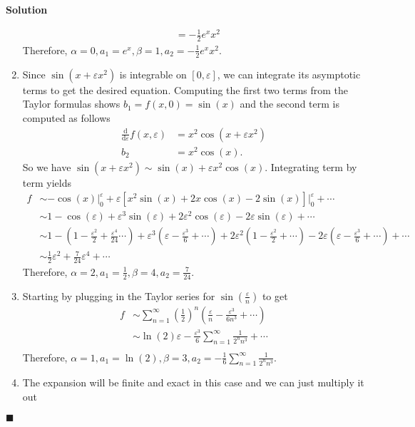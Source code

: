\documentclass[11pt]{article}
\newcommand{\vep}{\varepsilon}
\theoremstyle{problemstyle}
\newenvironment{solution}
  {\noindent\textbf{Solution}\quad}
  {\hfill$\blacksquare$\par\vspace{1em}}
\begin{document}
\begin{solution}
\begin{enumerate}
\begin{align*}
            & = -\frac{1}{2} e^x x^2
      \end{align*}
      Therefore, $\alpha = 0, a_1 = e^x, \beta = 1, a_2 = -\frac{1}{2} e^x x^2$.
    \item Since $\sin(x + \vep x^2)$ is integrable on $[0,\vep]$, we can integrate its asymptotic
      terms to get the desired equation. Computing the first two terms from the Taylor formulas
      shows $b_1 = f(x, 0) = \sin(x)$ and the second term is computed as follows
      \begin{align*}
        \frac{\mathrm{d}}{\mathrm{d}\vep}f(x,\vep) & = x^2 \cos(x + \vep x^2) \\
        b_2 & = x^2 \cos(x).
      \end{align*}
      So we have $\sin(x + \vep x^2) \sim \sin(x) + \vep x^2 \cos(x)$. Integrating term by term
      yields 
      \begin{align*}
        f & \sim -\cos(x) \rvert_0^\vep + \vep \left[ x^2 \sin(x) + 2x \cos(x) - 2 \sin(x) \right]
            \rvert_0^\vep + \cdots \\
          & \sim 1 - \cos(\vep) + \vep^3 \sin(\vep) + 2\vep^2 \cos(\vep) - 2\vep\sin(\vep) + \cdots \\
          & \sim 1 - (1 - \frac{\vep^2}{2} + \frac{\vep^4}{24} \cdots) + \vep^3 \left( \vep -
            \frac{\vep^3}{6} + \cdots \right) + 2\vep^2 \left( 1 - \frac{\vep^2}{2} + \cdots \right) -
            2 \vep \left( \vep - \frac{\vep^3}{6} + \cdots \right) + \cdots \\
          & \sim \frac{1}{2} \vep^2 + \frac{7}{24} \vep^4 + \cdots
      \end{align*}
      Therefore, $\alpha = 2, a_1 = \frac{1}{2}, \beta = 4, a_2 = \frac{7}{24}$.
    \item Starting by plugging in the Taylor series for $\sin\left(\frac{\vep}{n}\right)$ to get
      \begin{align*}
        f & \sim \sum_{n=1}^{\infty} \left(\frac{1}{2}\right)^n \left( \frac{\vep}{n} -
            \frac{\vep^3}{6n^3} + \cdots \right) \\
          & \sim \ln(2) \vep - \frac{\vep^3}{6} \sum_{n=1}^{\infty} \frac{1}{2^n n^3} + \cdots \\
      \end{align*}
      Therefore, $\alpha = 1, a_1 = \ln(2), \beta = 3, a_2 = -\frac{1}{6} \sum_{n=1}^{\infty}
      \frac{1}{2^n n^3}$.
    \item The expansion will be finite and exact in this case and we can just multiply it out

\end{enumerate}
\end{solution}
\end{document}

